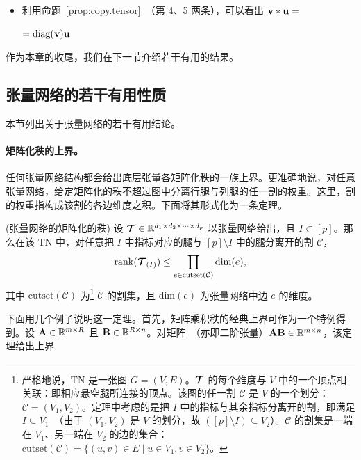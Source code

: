 \begin{remark}
\begin{itemize}
    \item 利用命题~\ref{prop:copy.tensor}~（第 4、5 两条），可以看出 
    $\mathbf{v}*\mathbf{u}=$
    $=\text{diag}(\mathbf{v})\mathbf{u}$
\end{itemize}
\end{remark}
作为本章的收尾，我们在下一节介绍若干有用的结果。

\subsection{张量网络的若干有用性质}\label{sec:useful-TNs}
本节列出关于张量网络的若干有用结论。 

\paragraph{矩阵化秩的上界。}
任何张量网络结构都会给出底层张量各矩阵化秩的一族上界。更准确地说，对任意张量网络，给定矩阵化的秩不超过图中分离行腿与列腿的任一割的权重。这里，割的权重指构成该割的各边维度之积。下面将其形式化为一条定理。 

\begin{theorem}(张量网络的矩阵化的秩)\label{thm: matricization-rank}
设 $\bm{\mathcal{T}} \in \mathbb{R}^{d_1\times d_2\times \dots \times d_p}$ 以张量网络给出，且 $I \subset [p]$。那么在该 TN 中，对任意把 $I$ 中指标对应的腿与 $[p] \setminus I$ 中的腿分离开的割 $\mathcal{C}$，
$$\mathrm{rank}(\bm{\mathcal{T}}_{(I)}) \leq \prod_{e \in  \mathrm{cutset}(\mathcal C)} \mathrm{dim}(e),$$
其中 $\mathrm{cutset}(\mathcal{C})$ 为\footnote{严格地说，TN 是一张图 $G=(V,E)$。$\bm{\mathcal{T}}$ 的每个维度与 $V$ 中的一个顶点相关联：即相应悬空腿所连接的顶点。该图的任一割 $\mathcal C$ 是 $V$ 的一个划分：$\mathcal{C} = (V_1, V_2)$。定理中考虑的是把 $I$ 中的指标与其余指标分离开的割，即满足 $I \subseteq V_1$~（由于 $(V_1,V_2)$ 是 $V$ 的划分，故 $([p]\setminus I) \subseteq V_2$）。$\mathcal{C}$ 的割集是一端在 $V_1$、另一端在 $V_2$ 的边的集合：$\mathrm{cutset}(\mathcal{C}) = \{(u,v) \in E \mid u\in V_1, v\in V_2 \}$。 } %
$\mathcal C$ 的割集，且 $\mathrm{dim}(e)$ 为张量网络中边 $e$ 的维度。
\end{theorem}
下面用几个例子说明这一定理。首先，矩阵乘积秩的经典上界可作为一个特例得到。设   $\mathbf{A}\in\mathbb{R}^{m\times R}$ 且 $\mathbf{B}\in\mathbb{R}^{R\times n}$。对矩阵~（亦即二阶张量）$\mathbf{AB} \in \mathbb{R}^{m \times n}$，该定理给出上界

